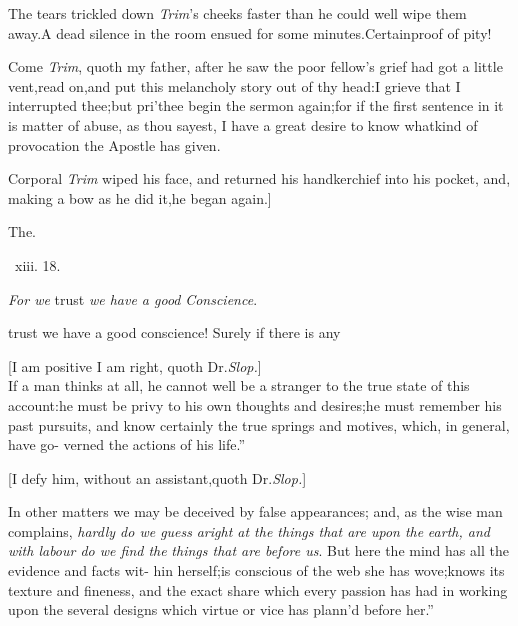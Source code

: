 \documentclass{article}
\begin{document}
\tsh The tears trickled down \textit{Trim}’s cheeks faster
than he could well wipe them away.\tsk A dead silence in the room
ensued for some minutes.\tsh Certain\break proof of pity!

Come \textit{Trim}, quoth my father, after he saw the poor
fellow’s grief had got a little vent,\tsk read
on,\tsk and put this melancholy story out of thy head:\tsk I
grieve that I interrupted thee;\tsk but pri’thee begin the sermon
again;\tsk for if the first sentence in it is matter of abuse, as
thou sayest, I have a great desire to know what\break kind of provocation
the Apostle has given.

Corporal \textit{Trim} wiped his face, and returned his
handkerchief into his pocket, and, making a bow as he did
it,\tsk he began again.]

\bigskip
\centerline{The\quad {}.}
\bigskip
\centerline{\, xiii. 18.}
\tsh \textit{For we} trust \textit{we have a good}\break
\textit{Conscience}.\tsh

trust we have a good conscience! Surely if there is any\break
{}

[I am positive I am right, quoth Dr.\@ \textit{Slop.}]\\
\newpage
\lqq If a man thinks at all, he cannot\break
\lqq well be a stranger to the true state of\break
\lqq this account:\tsk he must be privy to\break
\lqq his own thoughts and desires;\tsh he\break
\lqq must remember his past pursuits, and\break
\lqq know certainly the true springs and\break
\lqq motives, which, in general, have go-\break
\lqq verned the actions of his life.”

[I defy him, without an assistant,\break quoth Dr.\@ \textit{Slop.}]

\indent\lqq In other matters we may be deceived\break
\lqq by false appearances; and, as the wise\break
\lqq man complains, \textit{hardly do we guess}\break
\lqq\textit{aright at the things that are upon the}\break
\lqq\textit{earth, and with labour do we find the}\break
\lqq\textit{things that are before us}. But here the\break
\lqq mind has all the evidence and facts wit-\break
\lqq hin herself;\tsk is conscious of the web\break
\lqq she has wove;\tsk knows its texture and
\lqq fineness, and the exact share which\break
\lqq every passion has had in working upon\break
\lqq the several designs which virtue or vice\break
\lqq has plann’d before her.”
\end{document}
